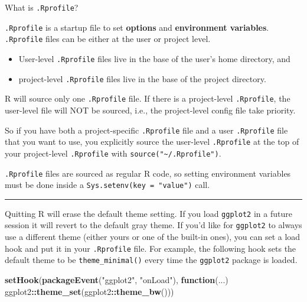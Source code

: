 \documentclass[
  a4paper,
  twoside,
  openright]{book}
\newenvironment{Shaded}{\begin{snugshade}}{\end{snugshade}}
\newcommand{\ControlFlowTok}[1]{\textcolor[rgb]{0.13,0.29,0.53}{\textbf{#1}}}
\newcommand{\FunctionTok}[1]{\textcolor[rgb]{0.13,0.29,0.53}{\textbf{#1}}}
\newcommand{\NormalTok}[1]{#1}
\newcommand{\SpecialCharTok}[1]{\textcolor[rgb]{0.81,0.36,0.00}{\textbf{#1}}}
\newcommand{\StringTok}[1]{\textcolor[rgb]{0.31,0.60,0.02}{#1}}
\providecommand{\tightlist}{%
  \setlength{\itemsep}{0pt}\setlength{\parskip}{0pt}}
\theoremstyle{definition}
\theoremstyle{definition}
\theoremstyle{definition}
\theoremstyle{definition}
\theoremstyle{remark}
\begin{document}
What is \texttt{.Rprofile}?

\texttt{.Rprofile} is a startup file to set {\textbf{options}} and {\textbf{environment variables}}. \texttt{.Rprofile} files can be either at the user or project level.

\begin{itemize}
\tightlist
\item
  User-level \texttt{.Rprofile} files live in the base of the user's {home directory}, and
\item
  project-level \texttt{.Rprofile} files live in the base of the project directory.
\end{itemize}

R will source only one \texttt{.Rprofile} file. If there is a project-level \texttt{.Rprofile}, the user-level file will {NOT} be sourced, i.e., the project-level config file take priority.

So if you have both a project-specific \texttt{.Rprofile} file and a user \texttt{.Rprofile} file that you want to use, you explicitly source the user-level \texttt{.Rprofile} at the top of your project-level \texttt{.Rprofile} with \texttt{source("\textasciitilde{}/.Rprofile")}.

\texttt{.Rprofile} files are sourced as regular R code, so setting environment variables must be done inside a \texttt{Sys.setenv(key\ =\ "value")} call.

\begin{center}\rule{0.5\linewidth}{0.5pt}\end{center}

Quitting R will erase the default theme setting. If you load \texttt{ggplot2} in a future session it will revert to the default gray theme. If you'd like for \texttt{ggplot2} to always use a different theme (either yours or one of the built-in ones), you can set a load hook and put it in your \texttt{.Rprofile} file. For example, the following hook sets the default theme to be \texttt{theme\_minimal()} every time the \texttt{ggplot2} package is loaded.

\begin{Shaded}
\begin{Highlighting}[]
\FunctionTok{setHook}\NormalTok{(}\FunctionTok{packageEvent}\NormalTok{(}\StringTok{"ggplot2"}\NormalTok{, }\StringTok{"onLoad"}\NormalTok{), }
        \ControlFlowTok{function}\NormalTok{(...) ggplot2}\SpecialCharTok{::}\FunctionTok{theme\_set}\NormalTok{(ggplot2}\SpecialCharTok{::}\FunctionTok{theme\_bw}\NormalTok{()))}
\end{Highlighting}
\end{Shaded}
\end{document}
